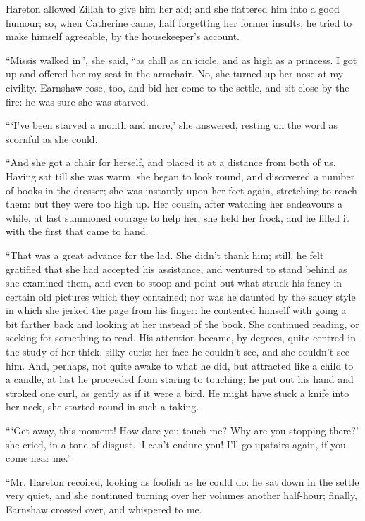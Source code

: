 \par Hareton allowed Zillah to give him her aid; and she flattered him into a good humour; so, when Catherine came, half forgetting her former insults, he tried to make himself agreeable, by the housekeeper's account.
\par “Missis walked in”, she said, “as chill as an icicle, and as high as a princess. I got up and offered her my seat in the armchair. No, she turned up her nose at my civility. Earnshaw rose, too, and bid her come to the settle, and sit close by the fire: he was sure she was starved.
\par “‘I've been starved a month and more,’ she answered, resting on the word as scornful as she could.
\par “And she got a chair for herself, and placed it at a distance from both of us. Having sat till she was warm, she began to look round, and discovered a number of books in the dresser; she was instantly upon her feet again, stretching to reach them: but they were too high up. Her cousin, after watching her endeavours a while, at last summoned courage to help her; she held her frock, and he filled it with the first that came to hand.
\par “That was a great advance for the lad. She didn't thank him; still, he felt gratified that she had accepted his assistance, and ventured to stand behind as she examined them, and even to stoop and point out what struck his fancy in certain old pictures which they contained; nor was he daunted by the saucy style in which she jerked the page from his finger: he contented himself with going a bit farther back and looking at her instead of the book. She continued reading, or seeking for something to read. His attention became, by degrees, quite centred in the study of her thick, silky curls: her face he couldn't see, and she couldn't see him. And, perhaps, not quite awake to what he did, but attracted like a child to a candle, at last he proceeded from staring to touching; he put out his hand and stroked one curl, as gently as if it were a bird. He might have stuck a knife into her neck, she started round in such a taking.
\par “‘Get away, this moment! How dare you touch me? Why are you stopping there?’ she cried, in a tone of disgust. ‘I can't endure you! I'll go upstairs again, if you come near me.’
\par “Mr. Hareton recoiled, looking as foolish as he could do: he sat down in the settle very quiet, and she continued turning over her volumes another half-hour; finally, Earnshaw crossed over, and whispered to me.
